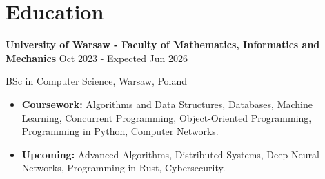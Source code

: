 \renewcommand{\subsection}[3]{
    \noindent\textbf{#1}  \emph{#2} \hfill #3 \break
}

\section{Education}
\subsection{University of Warsaw - Faculty of Mathematics, Informatics and Mechanics}{}{Oct 2023 - Expected Jun 2026}
BSc in Computer Science, Warsaw, Poland \hfill

\begin{itemize}
    \item \textbf{Coursework:} Algorithms and Data Structures, Databases, Machine Learning, Concurrent Programming, Object-Oriented Programming, Programming in Python, Computer Networks.
    \item \textbf{Upcoming:} Advanced Algorithms, Distributed Systems, Deep Neural Networks, Programming in Rust, Cybersecurity.
\end{itemize}

\vspace{1em}
